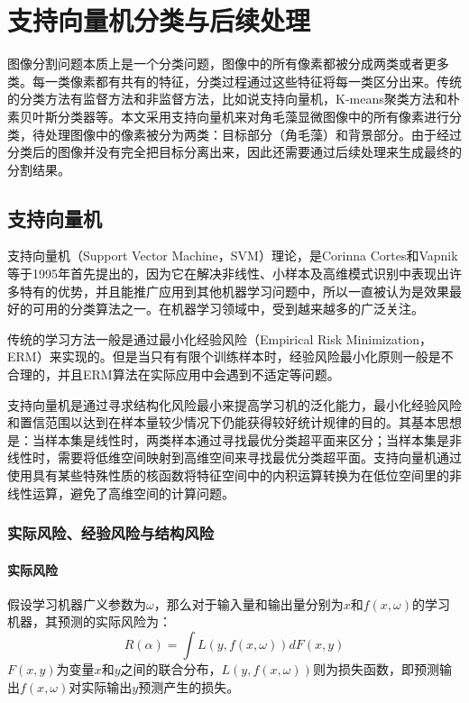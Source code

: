
\chapter{支持向量机分类与后续处理}
 图像分割问题本质上是一个分类问题，图像中的所有像素都被分成两类或者更多类。每一类像素都有共有的特征，分类过程通过这些特征将每一类区分出来。传统的分类方法有监督方法和非监督方法，比如说支持向量机\cite{cortes1995support}，K-means聚类方法\cite{macqueen1967some}和朴素贝叶斯分类器\cite{rish2001empirical}等。本文采用支持向量机来对角毛藻显微图像中的所有像素进行分类，待处理图像中的像素被分为两类：目标部分（角毛藻）和背景部分。由于经过分类后的图像并没有完全把目标分离出来，因此还需要通过后续处理来生成最终的分割结果。

\section{支持向量机}
支持向量机（Support Vector Machine，SVM）理论，是Corinna Cortes和Vapnik\cite{cortes1995support}等于1995年首先提出的，因为它在解决非线性、小样本及高维模式识别中表现出许多特有的优势，并且能推广应用到其他机器学习问题中，所以一直被认为是效果最好的可用的分类算法之一。在机器学习领域中，受到越来越多的广泛关注。

传统的学习方法一般是通过最小化经验风险（Empirical Risk Minimization，ERM）来实现的。但是当只有有限个训练样本时，经验风险最小化原则一般是不合理的，并且ERM算法在实际应用中会遇到不适定等问题。

支持向量机是通过寻求结构化风险最小来提高学习机的泛化能力，最小化经验风险和置信范围以达到在样本量较少情况下仍能获得较好统计规律的目的。其基本思想是：当样本集是线性时，两类样本通过寻找最优分类超平面来区分；当样本集是非线性时，需要将低维空间映射到高维空间来寻找最优分类超平面。支持向量机通过使用具有某些特殊性质的核函数将特征空间中的内积运算转换为在低位空间里的非线性运算，避免了高维空间的计算问题。
    
\subsection{实际风险、经验风险与结构风险}
\subsubsection{实际风险}
假设学习机器广义参数为$\omega$，那么对于输入量和输出量分别为$x$和$f(x,\omega)$的学习机器，其预测的实际风险为：
\begin{equation}
R(\alpha)=\int L(y,f(x,\omega))dF(x,y)
\end{equation}
$F(x,y)$为变量$x$和$y$之间的联合分布，$L(y,f(x,\omega))$则为损失函数，即预测输出$f(x,\omega)$对实际输出$y$预测产生的损失。

